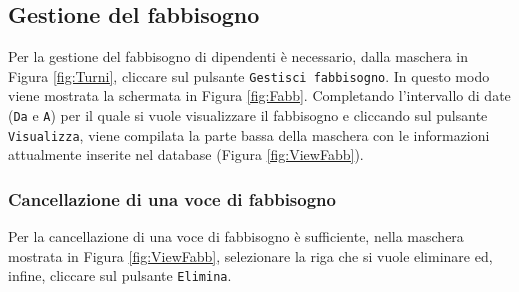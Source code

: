 \subsection{Gestione del fabbisogno}
Per la gestione del fabbisogno di dipendenti è necessario, dalla maschera in Figura \ref{fig:Turni}, cliccare sul pulsante \verb|Gestisci fabbisogno|. In questo modo viene mostrata la schermata in Figura \ref{fig:Fabb}.
\noindent
Completando l'intervallo di date (\verb|Da| e \verb|A|) per il quale si vuole visualizzare il fabbisogno e cliccando sul pulsante \verb|Visualizza|, viene compilata la parte bassa della maschera con le informazioni attualmente inserite nel database (Figura \ref{fig:ViewFabb}).
\subsubsection{Cancellazione di una voce di fabbisogno}
Per la cancellazione di una voce di fabbisogno è sufficiente, nella maschera mostrata in Figura \ref{fig:ViewFabb}, selezionare la riga che si vuole eliminare ed, infine, cliccare sul pulsante \verb|Elimina|.